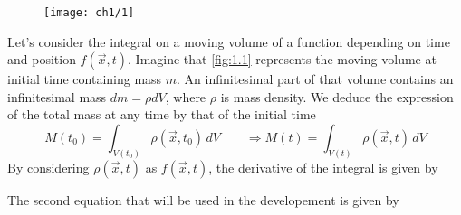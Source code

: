 	\begin{figure}
	\vspace{-5mm}
	\texttt{[image: ch1/1]}
	\label{fig:1.1}
	\end{figure}
	Let's consider the integral on a moving volume of a function depending on time and position $f(\vec{x},t)$. Imagine that \autoref{fig:1.1} represents the moving volume at initial time containing mass $m$. An infinitesimal part of that volume contains an infinitesimal mass $dm = \rho dV$, where $\rho$ is mass density. We deduce the expression of the total mass at any time by that of the initial time  
	\begin{equation}
		M(t_0) = \int _{V(t_0)}\rho (\vec{x},t_0)\, dV \qquad \Rightarrow M(t) = \int _{V(t)}\rho (\vec{x},t)\, dV
	\end{equation}
	By considering $\rho (\vec{x},t)$ as $f(\vec{x},t)$, the derivative of the integral is given by
	
	\begin{center}
	\end{center}
	
	The second equation that will be used in the developement is given by
	\begin{center}
	\end{center}
	
